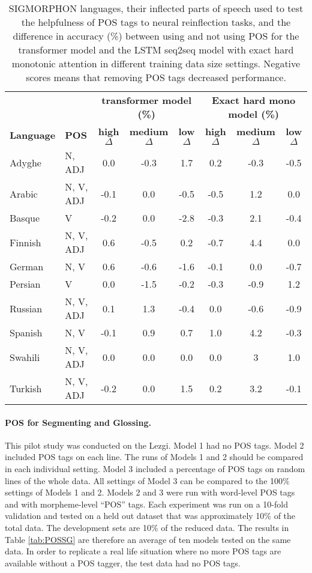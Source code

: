 \begin{table}[h!]
    \centering
    \begin{tabular}{ll|ccc|ccc}
    \toprule
        & & \multicolumn{3}{c|}{\textbf{transformer model (\%)}} & \multicolumn{3}{|c}{\textbf{Exact hard mono model (\%)}} \\
        \cline{3-8}
       \textbf{Language} & \textbf{POS} & \textbf{high $\Delta$} & \textbf{medium $\Delta$} & \textbf{low $\Delta$} & \textbf{high $\Delta$} & \textbf{medium $\Delta$} & \textbf{low $\Delta$} \\
      Adyghe  & N, ADJ & 0.0 & -0.3 & 1.7 & 0.2 & -0.3 & -0.5 \\
      Arabic & N, V, ADJ & -0.1 & 0.0 & -0.5 & -0.5 & 1.2 & 0.0 \\
      Basque &  V & -0.2 & 0.0 & -2.8 & -0.3 & 2.1 & -0.4 \\
      Finnish & N, V, ADJ & 0.6 & -0.5 & 0.2 & -0.7 & 4.4 & 0.0 \\
      German & N, V & 0.6 & -0.6 & -1.6 & -0.1 & 0.0 & -0.7 \\
      Persian & V & 0.0 & -1.5 & -0.2 & -0.3 & -0.9 & 1.2 \\
      Russian & N, V, ADJ & 0.1 & 1.3 & -0.4 & 0.0 & -0.6 & -0.9 \\
      Spanish & N, V & -0.1 & 0.9 & 0.7 & 1.0 & 4.2 & -0.3 \\
      Swahili & N, V, ADJ & 0.0 & 0.0 & 0.0 & 0.0 & 3 & 1.0 \\
      Turkish & N, V, ADJ & -0.2 & 0.0 & 1.5 & 0.2 & 3.2 & -0.1 \\
    \end{tabular}
    \caption[SIGMORPHON languages Reinflection with/out POS tags]{SIGMORPHON languages, their inflected parts of speech used to test the helpfulness of POS tags to neural reinflection tasks, and the difference in accuracy (\%) between using and not using POS for the transformer model and the LSTM seq2seq model with exact hard monotonic attention in different training data size settings. Negative scores means that removing POS tags decreased performance.}
    \label{tab:POSIGT2P}
\end{table}


\paragraph{POS for Segmenting and Glossing.}
This pilot study was conducted on the Lezgi. Model 1 had no POS tags. Model 2 included POS tags on each line. The runs of Models 1 and 2 should be compared in each individual setting. Model 3 included a percentage of POS tags on random lines of the whole data. All settings of Model 3 can be compared to the 100\% settings of Models 1 and 2. Models 2 and 3 were run with word-level POS tags and with morpheme-level ``POS'' tags. Each experiment was run on a 10-fold validation and tested on a held out dataset that was approximately 10\% of the total data. The development sets are 10\% of the reduced data. The results in Table \ref{tab:POSSG} are therefore an average of ten models tested on the same data. In order to replicate a real life situation where no more POS tags are available without a POS tagger, the test data had no POS tags. 

